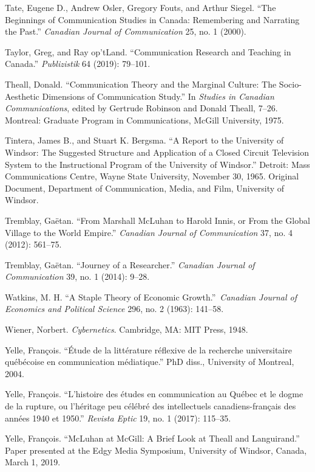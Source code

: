 \documentclass{tufte-handout}
\begin{document}
\begin{hangparas}{.25in}{1}
Tate, Eugene D., Andrew Osler, Gregory Fouts, and Arthur Siegel. ``The
Beginnings of Communication Studies in Canada: Remembering and Narrating
the Past.'' \emph{Canadian Journal of Communication} 25, no. 1 (2000).

Taylor, Greg, and Ray op'tLand. ``Communication Research and Teaching in
Canada.'' \emph{Publizistik} 64 (2019): 79--101.

Theall, Donald. ``Communication Theory and the Marginal Culture: The
Socio-Aesthetic Dimensions of Communication Study.'' In \emph{Studies in
Canadian Communications}, edited by Gertrude Robinson and Donald Theall,
7--26. Montreal: Graduate Program in Communications, McGill University,
1975.

Tintera, James B., and Stuart K. Bergsma. ``A Report to the University
of Windsor: The Suggested Structure and Application of a Closed Circuit
Television System to the Instructional Program of the University of
Windsor.'' Detroit: Mass Communications Centre, Wayne State University,
November 30, 1965. Original Document, Department of Communication,
Media, and Film, University of Windsor.

Tremblay, Gaëtan. ``From Marshall McLuhan to Harold Innis, or From the
Global Village to the World Empire.'' \emph{Canadian Journal of
Communication} 37, no. 4 (2012): 561--75.

Tremblay, Gaëtan. ``Journey of a Researcher.'' \emph{Canadian Journal of
Communication} 39, no. 1 (2014): 9--28.

Watkins, M. H. ``A Staple Theory of Economic Growth.''~\emph{Canadian
Journal of Economics and Political Science} 296, no. 2 (1963): 141--58.

Wiener, Norbert. \emph{Cybernetics}. Cambridge, MA: MIT Press, 1948.

Yelle, François. ``Étude de la littérature réflexive de la recherche
universitaire québécoise en communication médiatique.'' PhD diss.,
University of Montreal, 2004.

Yelle, François. ``L'histoire des études en communication au Québec et
le dogme de la rupture, ou l'héritage peu célébré des intellectuels
canadiens-français des années 1940 et 1950.'' \emph{Revista Eptic} 19,
no. 1 (2017): 115--35.

Yelle, François. ``McLuhan at McGill: A Brief Look at Theall and
Languirand.'' Paper presented at the Edgy Media Symposium, University of
Windsor, Canada, March 1, 2019.



\end{hangparas}
\end{document}
